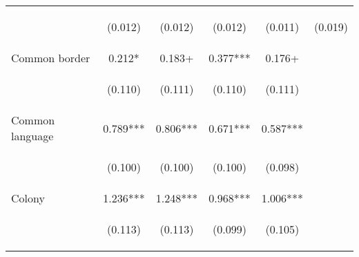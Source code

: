 \begin{center}
\begin{tabular}{lccccc}
\vspace{4pt} & \begin{footnotesize}(0.012)\end{footnotesize} & \begin{footnotesize}(0.012)\end{footnotesize} & \begin{footnotesize}(0.012)\end{footnotesize} & \begin{footnotesize}(0.011)\end{footnotesize} & \begin{footnotesize}(0.019)\end{footnotesize} \\
Common border & 0.212* & 0.183+ & 0.377*** & 0.176+ &  \\
\vspace{4pt} & \begin{footnotesize}(0.110)\end{footnotesize} & \begin{footnotesize}(0.111)\end{footnotesize} & \begin{footnotesize}(0.110)\end{footnotesize} & \begin{footnotesize}(0.111)\end{footnotesize} & \begin{footnotesize}\end{footnotesize} \\
Common language & 0.789*** & 0.806*** & 0.671*** & 0.587*** &  \\
\vspace{4pt} & \begin{footnotesize}(0.100)\end{footnotesize} & \begin{footnotesize}(0.100)\end{footnotesize} & \begin{footnotesize}(0.100)\end{footnotesize} & \begin{footnotesize}(0.098)\end{footnotesize} & \begin{footnotesize}\end{footnotesize} \\
Colony & 1.236*** & 1.248*** & 0.968*** & 1.006*** &  \\
\vspace{4pt} & \begin{footnotesize}(0.113)\end{footnotesize} & \begin{footnotesize}(0.113)\end{footnotesize} & \begin{footnotesize}(0.099)\end{footnotesize} & \begin{footnotesize}(0.105)\end{footnotesize} & \begin{footnotesize}\end{footnotesize} \\

\end{tabular}
\end{center}
